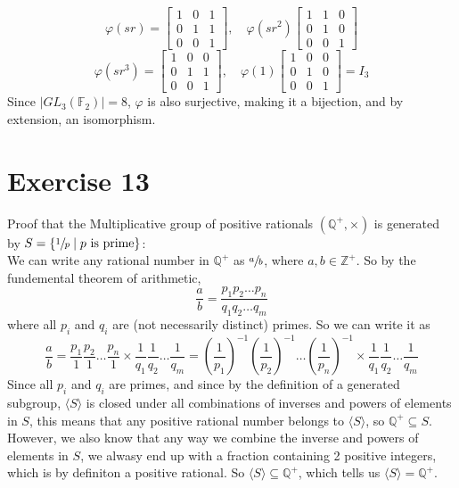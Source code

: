 \documentclass{article}
\newcommand{\Z}{\mathbb{Z}}
\newcommand{\Q}{\mathbb{Q}}
\newcommand{\F}{\mathbb{F}}
\newcommand{\sub}{\subseteq}
\begin{document}
    \[ \varphi(sr) = \begin{bmatrix} 1 & 0 & 1 \\
        0 & 1 & 1 \\
        0 & 0 & 1 \end{bmatrix}, \quad
    \varphi(sr^2) \begin{bmatrix} 1 & 1 & 0 \\
        0 & 1 & 0 \\
        0 & 0 & 1 \end{bmatrix} \]
    \[ \varphi(sr^3) = \begin{bmatrix} 1 & 0 & 0 \\
        0 & 1 & 1 \\
        0 & 0 & 1 \end{bmatrix}, \quad
    \varphi(1) \begin{bmatrix} 1 & 0 & 0 \\
        0 & 1 & 0 \\
        0 & 0 & 1 \end{bmatrix} = I_3 \]
    Since $|GL_3(\F_2)| = 8$, $\varphi$ is also surjective,
    making it a bijection,
    and by extension, an isomorphism.


    \section*{Exercise 13}
    Proof that the Multiplicative group of positive rationals
    $(\Q^+, \times)$ is generated
    by $S = \{\sfrac{1}{p} \mid p \text{ is prime}\}$: \\
    We can write any rational number in $\Q^+$ as $\sfrac{a}{b}$,
    where $a, b \in \Z^+$.
    So by the fundemental theorem of arithmetic,
    \[ \dfrac{a}{b} = \dfrac{p_1p_2 \dots p_n}{q_1q_2 \dots q_m} \]
    where all $p_i$ and $q_i$ are (not necessarily distinct) primes.
    So we can write it as
    \[ \dfrac{a}{b}
    = \dfrac{p_1}{1}\dfrac{p_2}{1} \dots \dfrac{p_n}{1} \times
    \dfrac{1}{q_1}\dfrac{1}{q_2} \dots \dfrac{1}{q_m}
    = \left(\dfrac{1}{p_1}\right)^{-1} \left(\dfrac{1}{p_2}\right)^{-1}
    \dots \left(\dfrac{1}{p_n}\right)^{-1}
    \times \dfrac{1}{q_1}\dfrac{1}{q_2} \dots \dfrac{1}{q_m} \]
    Since all $p_i$ and $q_i$ are primes,
    and since by the definition of a generated subgroup,
    $\langle S \rangle$ is closed under all combinations of
    inverses and powers of elements in $S$,
    this means that any positive rational number belongs
    to $\langle S \rangle$,
    so $\Q^+ \sub S$. \\
    However, we also know that any way we combine
    the inverse and powers of elements in $S$,
    we alwasy end up with a fraction containing 2 positive integers,
    which is by definiton a positive rational.
    So $\langle S \rangle \sub \Q^+$,
    which tells us $\langle S \rangle = \Q^+$.
\end{document}
